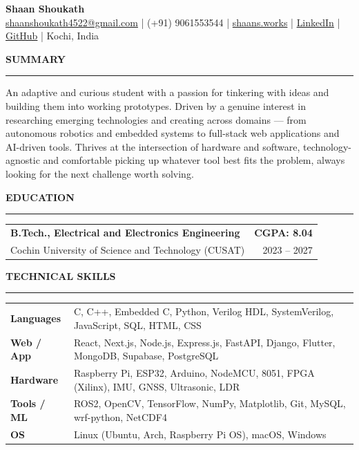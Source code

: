 \documentclass[10.8pt, a4paper]{article}
\newcommand{\cvsection}[1]{%
  \vspace{7pt}%
  {\color{accent}\textbf{\MakeUppercase{#1}}}\\[-5pt]
  {\color{rulecol}\rule{\linewidth}{0.5pt}}%
  \vspace{2pt}%
}
\begin{document}
\begin{center}
  {\Large\textbf{Shaan Shoukath}}\\[3pt]
  \small
  \href{mailto:shaanshoukath4522@gmail.com}{shaanshoukath4522@gmail.com}
  \;|\; (+91) 9061553544
  \;|\; \href{https://shaans.works}{shaans.works}
  \;|\; \href{https://www.linkedin.com/in/shaan-shoukath-04a9b12b2/}{LinkedIn}
  \;|\; \href{https://github.com/Shaan-Shoukath}{GitHub}
  \;|\; Kochi, India
\end{center}

\cvsection{Summary}
{\small An adaptive and curious student with a passion for tinkering with ideas and building them into working prototypes. Driven by a genuine interest in researching emerging technologies and creating across domains — from autonomous robotics and embedded systems to full-stack web applications and AI-driven tools. Thrives at the intersection of hardware and software, technology-agnostic and comfortable picking up whatever tool best fits the problem, always looking for the next challenge worth solving.}

\cvsection{Education}
\begin{tabularx}{\linewidth}{@{} X r @{}}
  \small\textbf{B.Tech., Electrical and Electronics Engineering} & \small\textbf{CGPA: 8.04} \\
  \small Cochin University of Science and Technology (CUSAT) & \small 2023 – 2027 \\
\end{tabularx}

\cvsection{Technical Skills}
\begin{tabularx}{\linewidth}{@{} l @{\hspace{6pt}} X @{}}
  \small\textbf{Languages}  & \small C, C++, Embedded C, Python, Verilog HDL, SystemVerilog, JavaScript, SQL, HTML, CSS \\
  \small\textbf{Web / App}  & \small React, Next.js, Node.js, Express.js, FastAPI, Django, Flutter, MongoDB, Supabase, PostgreSQL \\
  \small\textbf{Hardware}   & \small Raspberry Pi, ESP32, Arduino, NodeMCU, 8051, FPGA (Xilinx), IMU, GNSS, Ultrasonic, LDR \\
  \small\textbf{Tools / ML} & \small ROS2, OpenCV, TensorFlow, NumPy, Matplotlib, Git, MySQL, wrf-python, NetCDF4 \\
  \small\textbf{OS}         & \small Linux (Ubuntu, Arch, Raspberry Pi OS), macOS, Windows \\
\end{tabularx}
\end{document}
